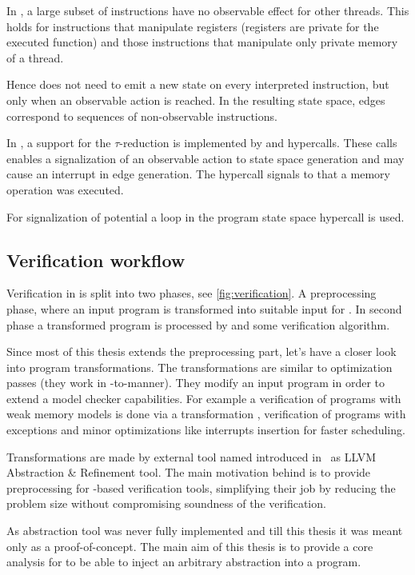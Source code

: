 In \LLVM, a large subset of instructions have no observable effect for other
threads. This holds for instructions that manipulate registers (registers
are private for the executed function) and those instructions that manipulate
only private memory of a thread.

Hence \DIVINE does not need to emit a new state on every interpreted
instruction, but only when an observable action is reached. In the resulting state
space, edges correspond to sequences of non-observable instructions.

In \DIVM, a support for the $\tau$-reduction is implemented by 
and  hypercalls. These calls enables a signalization of an
observable action to state space generation and may cause an interrupt in edge
generation. The  hypercall signals to \DIVM that a memory
operation was executed.

For signalization of potential a loop in the
program state space  hypercall is used.
\subsection{Verification workflow}

Verification in \DIVINE is split into two phases, see \autoref{fig:verification}.
A preprocessing phase, where an input program is
transformed into suitable input for \DIVM. In second phase a transformed program
is processed by \DIVM and some verification algorithm.

Since most of this thesis extends the preprocessing part, let's have a closer
look into program transformations. The transformations are similar to \LLVM
optimization passes (they work in \LLVM -to-\LLVM manner). They modify an input
program in order to extend a model checker capabilities. For example a
verification of programs with weak memory models is done via a transformation
\cite{Still16}, verification of programs with exceptions \cite{Still17} and minor
optimizations like interrupts insertion for faster scheduling.

Transformations are made by external tool named \LART introduced in~\cite{Rockai15}
as LLVM Abstraction \& Refinement tool. The main motivation behind \LART is to
provide preprocessing for \LLVM -based verification tools, simplifying their
job by reducing the problem size without compromising soundness of the
verification.

As abstraction tool \LART was never fully implemented and till this thesis it
was meant only as a proof-of-concept. The main aim of this thesis is to provide
a core analysis for \LART to be able to inject an arbitrary abstraction into a
program.

